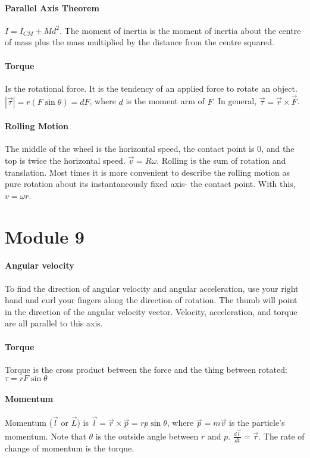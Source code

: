 \documentclass[10pt,letter]{article}
\begin{document}
\paragraph{Parallel Axis Theorem} $I = I_{CM}+Md^2$. The moment of inertia is the moment of inertia about the centre of mass plus the mass multiplied by the distance from the centre squared. 
\paragraph{Torque} Is the rotational force. It is the tendency of an applied force to rotate an object. $|\vec{\tau}|=r(F\sin\theta)=dF$, where $d$ is the moment arm of $F$. In general, $\vec{\tau}=\vec{r}\times\vec{F}$. 
\paragraph{Rolling Motion} The middle of the wheel is the horizontal speed, the contact point is 0, and the top is twice the horizontal speed. $\vec{v}=R\omega$. Rolling is the sum of rotation and translation. Most times it is more convenient to describe the rolling motion as pure rotation about its instantaneously fixed axis- the contact point. With this, $v=\omega r$. 

\pagebreak

\section*{Module 9} 
\paragraph{Angular velocity} To find the direction of angular velocity and angular acceleration, use your right hand and curl your fingers along the direction of rotation. The thumb will point in the direction of the angular velocity vector. Velocity, acceleration, and torque are all parallel to this axis. 
\paragraph{Torque} Torque is the cross product between the force and the thing between rotated: $\tau=rF\sin\theta$ 
\paragraph{Momentum} Momentum ($\vec{l}$ or $\vec{L}$) is $\vec{l}=\vec{r}\times\vec{p}=rp\sin\theta$, where $\vec{p}=m\vec{v}$ is the particle's momentum. Note that $\theta$ is the outside angle between $r$ and $p$. $\frac{d\vec{l}}{dt}=\vec{\tau}$. The rate of change of momentum is the torque. 
\end{document}
